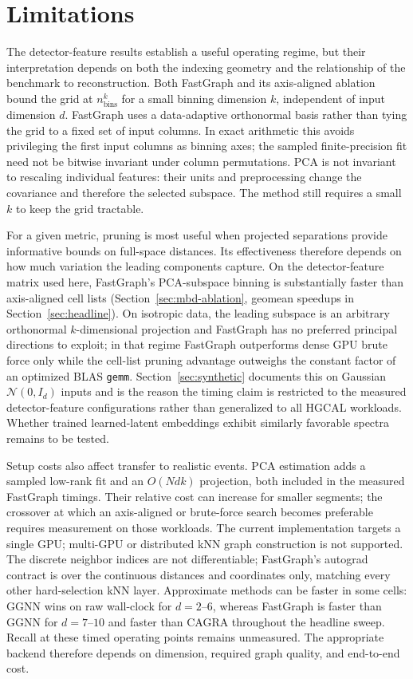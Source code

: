 \documentclass[final,3p,11pt]{elsarticle}
\begin{document}
\section{Limitations}
\label{sec:limitations}

The detector-feature results establish a useful operating regime, but
their interpretation depends on both the indexing geometry and the
relationship of the benchmark to reconstruction. Both FastGraph and
its axis-aligned ablation bound the grid at
$n_{\text{bins}}^{k}$ for a small binning dimension $k$, independent of input
dimension $d$. FastGraph uses a data-adaptive orthonormal basis rather than
tying the grid to a fixed set of input columns. In exact arithmetic this
avoids privileging the first input columns as binning axes; the sampled
finite-precision fit need not be bitwise invariant under column
permutations. PCA is not
invariant to rescaling individual features: their units and preprocessing
change the covariance and therefore the selected subspace. The method
still requires a small $k$ to keep the grid tractable.

For a given metric, pruning is most useful when projected separations
provide informative bounds on full-space distances. Its effectiveness
therefore depends on how much variation the leading components capture.
On the detector-feature matrix used here, FastGraph's
PCA-subspace binning is substantially
faster than axis-aligned cell lists (Section~\ref{sec:mbd-ablation},
geomean speedups in Section~\ref{sec:headline}). On isotropic data, the
leading subspace is an arbitrary orthonormal $k$-dimensional projection and FastGraph
has no preferred principal directions to exploit; in that regime
FastGraph outperforms dense GPU brute force
only while the cell-list pruning advantage outweighs the constant
factor of an optimized BLAS \texttt{gemm}. Section~\ref{sec:synthetic}
documents this on Gaussian $\mathcal{N}(0, I_d)$ inputs and is the
reason the timing claim is restricted to the measured detector-feature
configurations rather than generalized to all HGCAL workloads. Whether trained
learned-latent embeddings exhibit similarly favorable spectra remains to be
tested.

Setup costs also affect transfer to realistic events. PCA estimation
adds a sampled low-rank fit and an $O(Ndk)$ projection, both included
in the measured FastGraph timings. Their relative cost can increase
for smaller segments; the crossover at which an axis-aligned or
brute-force search becomes preferable requires measurement on those
workloads. The current implementation targets a single
GPU; multi-GPU or distributed kNN graph construction is not
supported. The discrete neighbor indices are not differentiable;
FastGraph's autograd contract is over the continuous distances and
coordinates only, matching every other hard-selection kNN layer.
Approximate methods can be faster in some cells: GGNN
wins on raw wall-clock for $d{=}2$--$6$, whereas FastGraph is faster than
GGNN for $d{=}7$--$10$ and faster than CAGRA throughout the headline sweep.
Recall at these timed operating points remains unmeasured.
The appropriate backend therefore depends on dimension, required graph
quality, and end-to-end cost.
\end{document}
